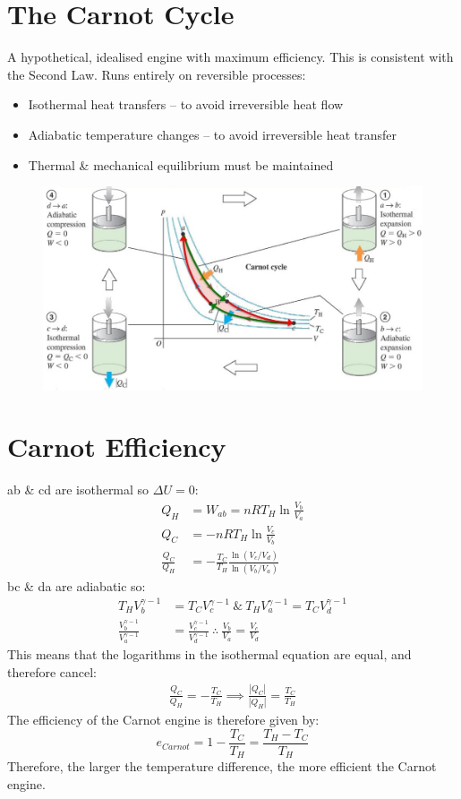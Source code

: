 \documentclass[a4paper, 11pt, normalem]{report}
\begin{document}
\section{The Carnot Cycle}
A hypothetical, idealised engine with maximum efficiency.
This is consistent with the Second Law.
Runs entirely on reversible processes:
\begin{itemize}
	\item Isothermal heat transfers -- to avoid irreversible heat flow
	\item Adiabatic temperature changes -- to avoid irreversible heat transfer
	\item Thermal \& mechanical equilibrium must be maintained
\end{itemize}
\begin{figure}[H]
    \centering
    \includegraphics[scale=0.55]{Carnot.jpg}
\end{figure}

\section{Carnot Efficiency}
ab \& cd are isothermal so ${\Delta}U = 0$:
\begin{align}
    Q_{H} &= W_{ab} = nRT_{H}\ln{\frac{V_{b}}{V_{a}}} \\
    Q_{C} &= -nRT_{H}\ln{\frac{V_{c}}{V_{b}}} \\
    \frac{Q_{C}}{Q_{H}} &= -\frac{T_{C}}{T_{H}}\frac{\ln{(V_{c}/V_{d})}}{\ln{(V_{b}/V_{a})}}
\end{align}
bc \& da are adiabatic so:
\begin{align}
    T_{H}V_{b}^{\gamma - 1} &= T_{C}V_{c}^{\gamma - 1} ~\&~ T_{H}V_{a}^{\gamma - 1} = T_{C}V_{d}^{\gamma - 1} \\
    \frac{V_{b}^{\gamma - 1}}{V_{a}^{\gamma - 1}} &= \frac{V_{c}^{\gamma - 1}}{V_{d}^{\gamma - 1}} ~\therefore~ \frac{V_{b}}{V_{a}} = \frac{V_{c}}{V_{d}}
\end{align}
This means that the logarithms in the isothermal equation are equal, and therefore cancel:
\begin{align}
	\frac{Q_{C}}{Q_{H}} = -\frac{T_{C}}{T_{H}} \implies \frac{|Q_{C}|}{|Q_{H}|} = \frac{T_{C}}{T_{H}}
\end{align}
The efficiency of the Carnot engine is therefore given by:
\begin{equation}
	e_{Carnot} = 1 - \frac{T_{C}}{T_{H}} = \frac{T_{H} - T_{C}}{T_{H}}
\end{equation}
Therefore, the larger the temperature difference, the more efficient the Carnot engine.
\end{document}
